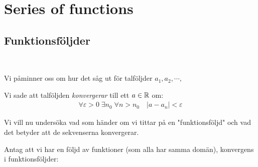 \section{Series of functions}\par
\subsection{Funktionsföljder}\hfill\\\par
\noindent Vi påminner oss om hur det såg ut för talföljder $a_1,a_2,\cdots,$\par
\noindent Vi sade att talföljden \textit{konvergerar} till ett $a\in \mathbb{R}$ om:
\begin{equation*}
  \begin{gathered}
    \forall\varepsilon>0\;\exists n_0\;\forall n>n_0 \quad\left|a-a_n\right|<\varepsilon
  \end{gathered}
\end{equation*}
\par\bigskip
\noindent Vi vill nu undersöka vad som händer om vi tittar på en "funktionsföljd" och vad det betyder att de sekvenserna konvergerar.
\par\bigskip
\noindent Antag att vi har en följd av funktioner (som alla har samma domän), konvergens i funktionsföljder:
\par\bigskip
